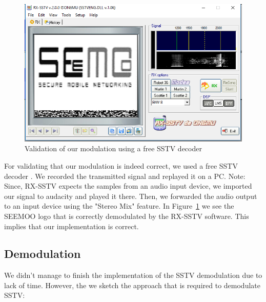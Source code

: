 \begin{figure}
	\centering
	\includegraphics[width=1.0\linewidth]{gfx/screenshot_rxsstv.png}
	\caption{Validation of our modulation using a free SSTV decoder \cite{rxsstv}}
	\label{fig:impl:sstv:rxsstv}
\end{figure}

For validating that our modulation is indeed correct, we used a free SSTV decoder \cite{rxsstv}. We recorded the transmitted signal and replayed it on a PC. 
Note: Since, RX-SSTV expects the samples from an audio input device, we imported our signal to audacity and played it there. Then, we forwarded the audio output to an input device using the "Stereo Mix" feature. 
In Figure~\ref{fig:impl:sstv:rxsstv} we see the SEEMOO logo that is correctly demodulated by the RX-SSTV software. This implies that our implementation is correct.


\subsection{Demodulation}
\label{subsubsec:impl:sstv:demod}

We didn't manage to finish the implementation of the SSTV demodulation due to lack of time. However, the we sketch the approach that is required to demodulate SSTV: 

